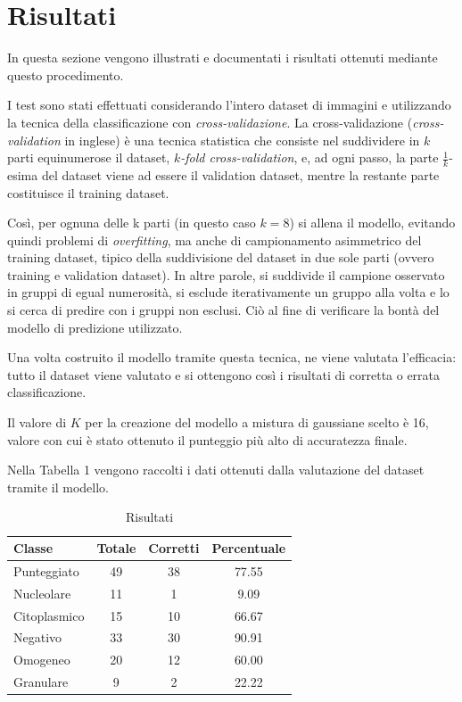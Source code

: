 \section{Risultati}

In questa sezione vengono illustrati e documentati i risultati ottenuti mediante questo procedimento. 

I test sono stati effettuati considerando l'intero dataset di immagini e utilizzando la tecnica della classificazione con \emph{cross-validazione}. La cross-validazione (\emph{cross-validation} in inglese) è una tecnica statistica che consiste nel suddividere in $k$ parti equinumerose il dataset, \emph{$k$-fold cross-validation}, e, ad ogni passo, la parte $\frac{1}{k}$-esima del dataset viene ad essere il validation dataset, mentre la restante parte costituisce il training dataset. 

Così, per ognuna delle k parti (in questo caso $k = 8$) si allena il modello, evitando quindi problemi di \emph{overfitting}, ma anche di campionamento asimmetrico del training dataset, tipico della suddivisione del dataset in due sole parti (ovvero training e validation dataset). In altre parole, si suddivide il campione osservato in gruppi di egual numerosità, si esclude iterativamente un gruppo alla volta e lo si cerca di predire con i gruppi non esclusi. Ciò al fine di verificare la bontà del modello di predizione utilizzato.

Una volta costruito il modello tramite questa tecnica, ne viene valutata l'efficacia: tutto il dataset viene valutato e si ottengono così i risultati di corretta o errata classificazione.

Il valore di $K$ per la creazione del modello a mistura di gaussiane scelto è 16, valore con cui è stato ottenuto il punteggio più alto di accuratezza finale.

Nella Tabella 1 vengono raccolti i dati ottenuti dalla valutazione del dataset tramite il modello.

\begin{table}[H]
\centering
\footnotesize
\begin{tabular}{|l | c | c | c |} 
 \hline 
 \textbf{Classe} &  \textbf{Totale} & \textbf{Corretti} & \textbf{Percentuale} \\ [0.5ex] 
 \hline\hline
 Punteggiato & 49 & 38 & 77.55\\
 Nucleolare & 11 & 1 & 9.09\\
 Citoplasmico & 15 & 10 & 66.67\\
 Negativo & 33 & 30 & 90.91\\
 Omogeneo & 20 & 12 & 60.00\\
 Granulare & 9 & 2 & 22.22\\
 \hline
\end{tabular}
\caption{Risultati}
\label{table:1}
\end{table}

